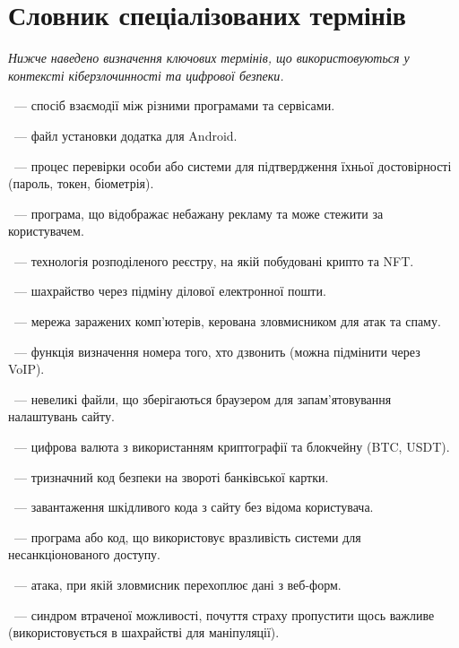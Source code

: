 ﻿%
\chapter{Словник спеціалізованих термінів}
\label{apdx:glossary}

\noindent\textit{Нижче наведено визначення ключових термінів, що використовуються у контексті кіберзлочинності та цифрової безпеки.}

\vspace{0.5cm}

~--- спосіб взаємодії між різними програмами та сервісами.

~--- файл установки додатка для Android.

~--- процес перевірки особи або системи для підтвердження їхньої достовірності (пароль, токен, біометрія).

~--- програма, що відображає небажану рекламу та може стежити за користувачем.

~--- технологія розподіленого реєстру, на якій побудовані крипто та NFT.

~--- шахрайство через підміну ділової електронної пошти.

~--- мережа заражених комп'ютерів, керована зловмисником для атак та спаму.

~--- функція визначення номера того, хто дзвонить (можна підмінити через VoIP).

~--- невеликі файли, що зберігаються браузером для запам'ятовування налаштувань сайту.

\newpage

~--- цифрова валюта з використанням криптографії та блокчейну (BTC, USDT).

~--- тризначний код безпеки на звороті банківської картки.

~--- завантаження шкідливого кода з сайту без відома користувача.

~--- програма або код, що використовує вразливість системи для несанкціонованого доступу.

~--- атака, при якій зловмисник перехоплює дані з веб-форм.

~--- синдром втраченої можливості, почуття страху пропустити щось важливе (використовується в шахрайстві для маніпуляції).

